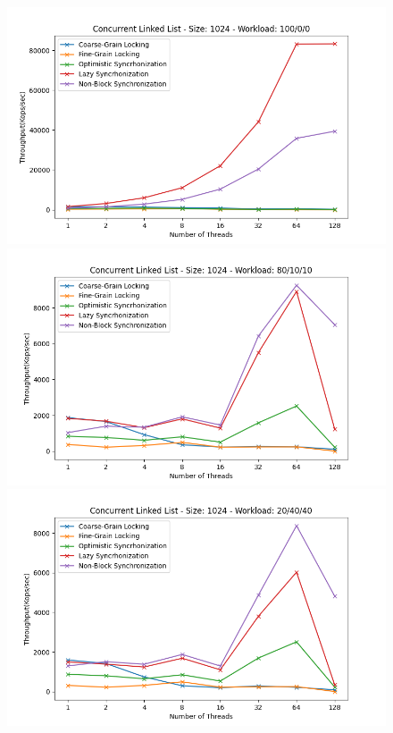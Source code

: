 \documentclass[../final_report.tex]{subfiles}
\begin{document}
\begin{figure}[H]
    \centering
        \includegraphics[scale=0.4]{outFiles/plots/concurrent_data_structs_all_1024_100_0_0.png}
        \includegraphics[scale=0.4]{outFiles/plots/concurrent_data_structs_all_1024_80_10_10.png}
        \includegraphics[scale=0.4]{outFiles/plots/concurrent_data_structs_all_1024_20_40_40.png}

\end{figure}
\end{document}
